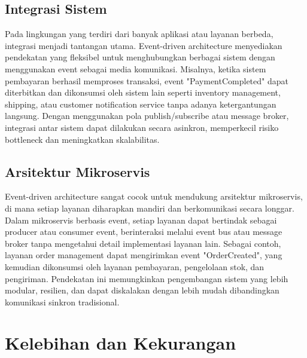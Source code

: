 \subsection{Integrasi Sistem}
Pada lingkungan yang terdiri dari banyak aplikasi atau layanan berbeda, integrasi menjadi tantangan utama. Event-driven architecture menyediakan pendekatan yang fleksibel untuk menghubungkan berbagai sistem dengan menggunakan event sebagai media komunikasi. Misalnya, ketika sistem pembayaran berhasil memproses transaksi, event "PaymentCompleted" dapat diterbitkan dan dikonsumsi oleh sistem lain seperti inventory management, shipping, atau customer notification service tanpa adanya ketergantungan langsung. Dengan menggunakan pola publish/subscribe atau message broker, integrasi antar sistem dapat dilakukan secara asinkron, memperkecil risiko bottleneck dan meningkatkan skalabilitas.

\subsection{Arsitektur Mikroservis}
Event-driven architecture sangat cocok untuk mendukung arsitektur mikroservis, di mana setiap layanan diharapkan mandiri dan berkomunikasi secara longgar. Dalam mikroservis berbasis event, setiap layanan dapat bertindak sebagai producer atau consumer event, berinteraksi melalui event bus atau message broker tanpa mengetahui detail implementasi layanan lain. Sebagai contoh, layanan order management dapat mengirimkan event "OrderCreated", yang kemudian dikonsumsi oleh layanan pembayaran, pengelolaan stok, dan pengiriman. Pendekatan ini memungkinkan pengembangan sistem yang lebih modular, resilien, dan dapat diskalakan dengan lebih mudah dibandingkan komunikasi sinkron tradisional.


\section{Kelebihan dan Kekurangan}

